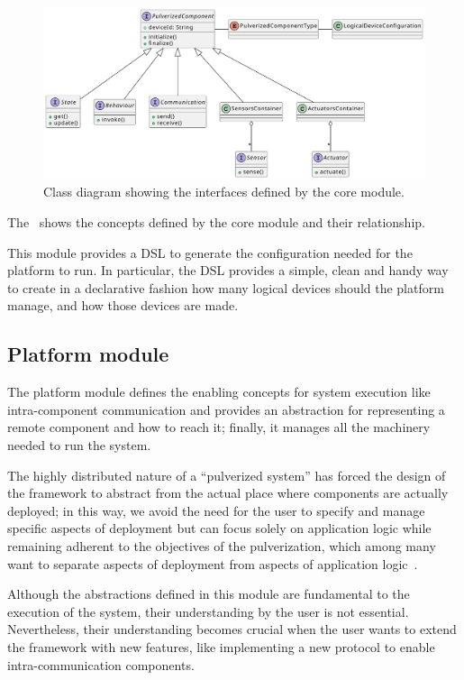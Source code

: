 \begin{figure}[ht]
	\centering
	\includegraphics[width=\textwidth]{figures/core-design-interfaces.pdf}
	\caption{Class diagram showing the interfaces defined by the core module.}
	\label{fig:core-module-architecture}
\end{figure}

The~ shows the concepts defined by the core module and their relationship.

This module provides a DSL to generate the configuration needed for the platform to run. In particular, the DSL provides a simple, clean and handy
way to create in a declarative fashion how many logical devices should the platform manage, and how those devices are made.

\subsection{Platform module}
\label{sec:platform-module}

The platform module defines the enabling concepts for system execution like intra-component communication and provides an abstraction for
representing a remote component and how to reach it; finally, it manages all the machinery needed to run the system.

The highly distributed nature of a ``pulverized system'' has forced the design of the framework to abstract from the actual place where components
are actually deployed; in this way, we avoid the need for the user to specify and manage specific aspects of deployment but can focus solely on
application logic while remaining adherent to the objectives of the pulverization, which among many want to separate aspects of
deployment from aspects of application logic~\cite{fi12110203}.

Although the abstractions defined in this module are fundamental to the execution of the system, their understanding by the user is not essential.
Nevertheless, their understanding becomes crucial when the user wants to extend the framework with new features, like implementing a new protocol to
enable intra-communication components.

